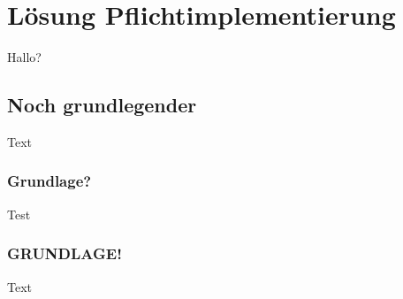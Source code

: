 \section{L\"osung Pflichtimplementierung}
\label{sec:lsgpflicht}

Hallo?

\subsection{Noch grundlegender}
Text

\subsubsection{Grundlage?}
Test

\subsubsection{GRUNDLAGE!}
Text